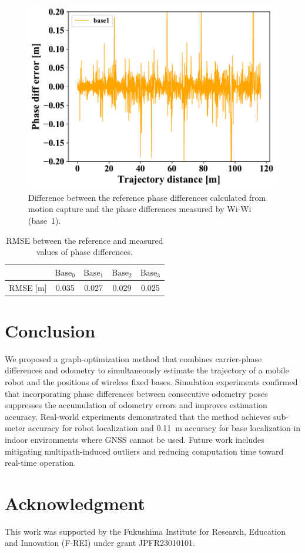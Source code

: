 \documentclass[conference]{IEEEtran}
\begin{document}
\begin{figure}
    \centering
    \includegraphics[width=0.99\linewidth]{figures/robosym_distance_pdm_differences.pdf}
    \caption{Difference between the reference phase differences calculated from motion capture and the phase differences measured by Wi-Wi (base~1).}
    \label{fig:vicon_vs_wiwi}
\end{figure}

\begin{table}[tb]
    \centering
    \caption{RMSE between the reference and measured values of phase differences.}
    \begin{tabular}{|c|c|c|c|c|}
    \hline
         & $\mathrm{Base}_0$ & $\mathrm{Base}_1$ & $\mathrm{Base}_2$ & $\mathrm{Base}_3$ \\
    \hline
     RMSE [m] & 0.035 & 0.027 & 0.029 & 0.025 \\
     \hline
    \end{tabular}
    \label{tab:vicon_vs_wiwi}
\end{table}

\section{Conclusion}
We proposed a graph-optimization method that combines carrier-phase differences and odometry to simultaneously estimate the trajectory of a mobile robot and the positions of wireless fixed bases.
Simulation experiments confirmed that incorporating phase differences between consecutive odometry poses suppresses the accumulation of odometry errors and improves estimation accuracy.
Real-world experiments demonstrated that the method achieves sub-meter accuracy for robot localization and 0.11~m accuracy for base localization in indoor environments where GNSS cannot be used.
Future work includes mitigating multipath-induced outliers and reducing computation time toward real-time operation.

\section*{Acknowledgment}
This work was supported by the Fukushima Institute for Research, Education and Innovation (F-REI) under grant JPFR23010101.



\end{document}
